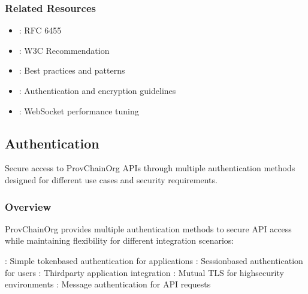 \documentclass[letterpaper,10pt,english]{sphinxmanual}
\begin{document}
\subsubsection{Related Resources}
\label{\detokenize{api/websocket-api:related-resources}}\begin{itemize}
\item {} 
\sphinxAtStartPar
{}: RFC 6455

\item {} 
\sphinxAtStartPar
{}: W3C Recommendation

\item {} 
\sphinxAtStartPar
{}: Best practices and patterns

\item {} 
\sphinxAtStartPar
{}: Authentication and encryption guidelines

\item {} 
\sphinxAtStartPar
{}: WebSocket performance tuning

\end{itemize}

\sphinxstepscope


\subsection{Authentication}
\label{\detokenize{api/authentication:authentication}}\label{\detokenize{api/authentication::doc}}
\sphinxAtStartPar
Secure access to ProvChainOrg APIs through multiple authentication methods designed for different use cases and security requirements.




\subsubsection{Overview}
\label{\detokenize{api/authentication:overview}}
\sphinxAtStartPar
ProvChainOrg provides multiple authentication methods to secure API access while maintaining flexibility for different integration scenarios:

\sphinxAtStartPar
{}
\sphinxhyphen{} : Simple token\sphinxhyphen{}based authentication for applications
\sphinxhyphen{} : Session\sphinxhyphen{}based authentication for users
\sphinxhyphen{} : Third\sphinxhyphen{}party application integration
\sphinxhyphen{} : Mutual TLS for high\sphinxhyphen{}security environments
\sphinxhyphen{} : Message authentication for API requests
\end{document}
